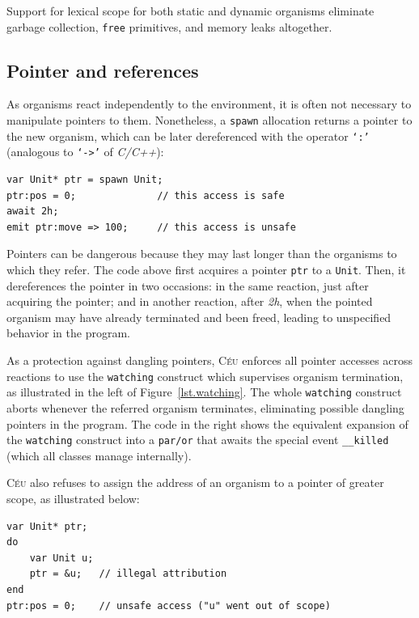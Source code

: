 \documentclass{sigplanconf}
\newcommand{\CEU}{\textsc{C\'{e}u}\xspace}
\newcommand{\code}[1] {{\small{\texttt{#1}}}}
\newcommand{\1}{\;}
\newcommand{\2}{\;\;}
\newcommand{\3}{\;\;\;}
\newcommand{\5}{\;\;\;\;\;}
\begin{document}
Support for lexical scope for both static and dynamic organisms eliminate 
garbage collection, \code{free} primitives, and memory leaks altogether.


\subsection{Pointer and references}
\label{sec.orgs.refs}

As organisms react independently to the environment, it is often not necessary 
to manipulate pointers to them.
%
Nonetheless, a \code{spawn} allocation returns a pointer to the new organism, 
which can be later dereferenced with the operator \code{`:'} (analogous to 
\code{`->'} of \emph{C/C++}):

\begin{lstlisting}
var Unit* ptr = spawn Unit;
ptr:pos = 0;              // this access is safe
await 2h;
emit ptr:move => 100;     // this access is unsafe
\end{lstlisting}

Pointers can be dangerous because they may last longer than the organisms to 
which they refer.
%
The code above first acquires a pointer \code{ptr} to a \code{Unit}.
Then, it dereferences the pointer in two occasions:
in the same reaction, just after acquiring the pointer;
and in another reaction, after \emph{2h}, when the pointed organism may have 
already terminated and been freed, leading to unspecified behavior in the 
program.

As a protection against dangling pointers, \CEU enforces all pointer accesses 
across reactions to use the \code{watching} construct which supervises organism 
termination, as illustrated in the left of Figure~\ref{lst.watching}.
%
The whole \code{watching} construct aborts whenever the referred organism 
terminates, eliminating possible dangling pointers in the program.
%
The code in the right shows the equivalent expansion of the \code{watching} 
construct into a \code{par/or} that awaits the special event \code{\_\_killed} 
(which all classes manage internally).

\CEU also refuses to assign the address of an organism to a pointer of greater 
scope, as illustrated below:

\begin{lstlisting}
var Unit* ptr;
do
    var Unit u;
    ptr = &u;   // illegal attribution
end
ptr:pos = 0;    // unsafe access ("u" went out of scope)
\end{lstlisting}
\end{document}
